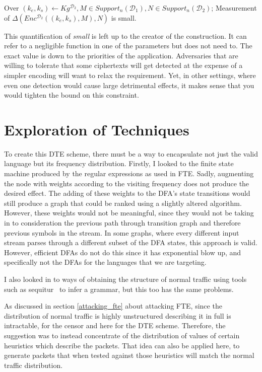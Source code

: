 \documentclass[ %
                    author={Samuel Russell},
                supervisor={Prof. Bogdan Warinschi},
                    degree={MEng},
                     title={Innocuous Ciphertexts},
                  subtitle={The DE-CENSOR Scheme},
                      type={research},
                      year={2018} ]{dissertation}
\begin{document}
Over $ (k_e,k_s) \leftarrow Kg^{\mathcal{D}_2}, M \in Support_n(\mathcal{D}_1), N \in Support_n(\mathcal{D}_2)$; Measurement of $\Delta \left(  Enc^{\mathcal{D}_2}((k_e,k_s), M), N  \right)$ is small.

This quantification of \textit{small} is left up to the creator of the construction.
It can refer to a negligible function in one of the parameters but does not need to.
The exact value is down to the priorities of the application.
Adversaries that are willing to tolerate that some ciphertexts will get detected at the expense of a simpler encoding will want to relax the requirement.
Yet, in other settings, where even one detection would cause large detrimental effects, it makes sense that you would tighten the bound on this constraint.

\section{Exploration of Techniques}

To create this DTE scheme, there must be a way to encapsulate not just the valid language but its frequency distribution.
Firstly, I looked to the finite state machine produced by the regular expressions as used in FTE. Sadly, augmenting the node with weights according to the visiting frequency does not produce the desired effect.
The adding of these weights to the DFA's state transitions would still produce a graph that could be ranked using a slightly altered algorithm.
However, these weights would not be meaningful, since they would not be taking in to consideration the previous path through transition graph and therefore previous symbols in the stream.
In some graphs, where every different input stream parses through a different subset of the DFA states, this approach is valid.
However, efficient DFAs do not do this since it has exponential blow up, and specifically not the DFAs for the languages that we are targeting.

I also looked in to ways of obtaining the structure of normal traffic using tools such as sequitur~\cite{sequitur} to infer a grammar, but this too has the same problems. 

As discussed in section \ref{attacking_fte} about attacking FTE, since the distribution of normal traffic is highly unstructured describing it in full is intractable, for the censor and here for the DTE scheme.
Therefore, the suggestion was to instead concentrate of the distribution of values of certain heuristics which describe the packets.
That idea can also be applied here, to generate packets that when tested against those heuristics will match the normal traffic distribution.
\end{document}
